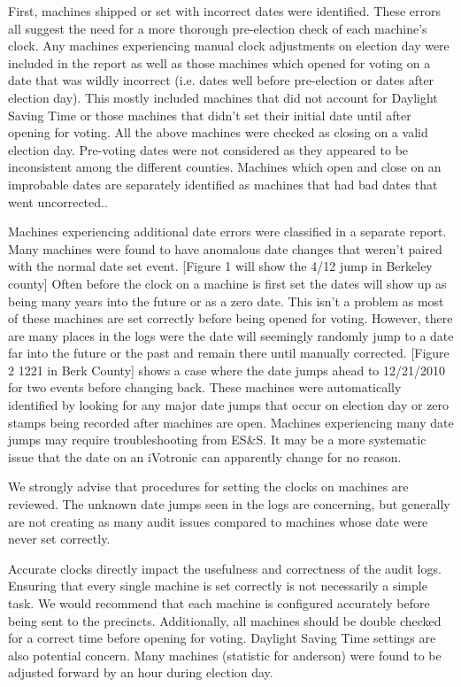 First, machines shipped or set with incorrect dates were identified.  These errors all suggest the need for a more thorough pre-election check of each machine's clock.   Any machines experiencing manual clock adjustments on election day were included in the report as well as those machines which opened for voting on a date that was wildly incorrect (i.e. dates well before pre-election or dates after election day). This mostly included machines that did not account for Daylight Saving Time or  those machines that didn't set their initial date until after opening for voting.  All the above machines were checked as closing on a valid election day.  Pre-voting dates were not considered as they appeared to be inconsistent among the different counties. Machines which open and close on an improbable dates are separately identified as machines that had bad dates that went uncorrected..  

Machines experiencing additional date errors were classified in a separate report.  Many machines were found to have anomalous date changes that weren't paired with the normal date set event. [Figure 1 will show the 4/12 jump in Berkeley county] Often before the clock on a machine is first set the dates will show up as being many years into the future or as a zero date.  This isn't a problem as most  of these machines are set correctly before being opened for voting.  However, there are many places in the logs were the date will seemingly randomly jump to a date far into the future or the past and remain there until manually corrected.  [Figure 2 12\/21 in Berk County] shows a case where the date jumps ahead to 12/21/2010 for two events before changing back.  These machines were automatically identified by looking for any major date jumps that occur on election day or zero stamps being recorded after machines are open. Machines experiencing many date jumps may require troubleshooting from ES\&S.  It may be a more systematic issue that the date on an iVotronic can apparently change for no reason.

We strongly advise that procedures for setting the clocks on machines are reviewed.  The unknown date jumps seen in the logs are concerning, but generally are not creating as many audit issues compared to machines whose date were never set correctly.

Accurate clocks directly impact the usefulness and correctness of the audit logs. Ensuring that every single machine is set correctly is not necessarily a simple task.  We would recommend that each machine is configured accurately before being sent to the precincts.  Additionally, all machines should be double checked for a correct time before opening for voting.  Daylight Saving Time settings are also potential concern.  Many machines (statistic for anderson) were found to be adjusted forward by an hour during election day.  

